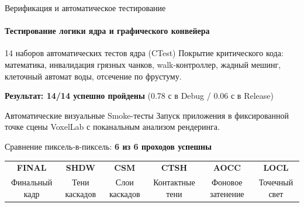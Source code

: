 \begin{frame}{Верификация и автоматическое тестирование}
  \framesubtitle{Тестирование логики ядра и графического конвейера}
  \begin{block}{14 наборов автоматических тестов ядра (CTest)}
    \small
    Покрытие критического кода: математика, инвалидация грязных чанков, walk-контроллер,
    жадный мешинг, клеточный автомат воды, отсечение по фрустуму.
    \begin{center}
      \textbf{Результат: 14/14 успешно пройдены} (0.78 с в Debug / 0.06 с в Release)
    \end{center}
  \end{block}

  \begin{block}{Автоматические визуальные Smoke-тесты}
    \small
    Запуск приложения в фиксированной точке сцены VoxelLab с поканальным анализом рендеринга.
    \begin{center}
      Сравнение пиксель-в-пиксель: \textbf{6 из 6 проходов успешны}
    \end{center}
    \scriptsize
    \begin{tabular}{cccccc}
      \textbf{FINAL} & \textbf{SHDW} & \textbf{CSM} & \textbf{CTSH} & \textbf{AOCC} & \textbf{LOCL} \\
      Финальный кадр & Тени каскадов & Слои каскадов & Контактные тени & Фоновое затенение & Точечный свет \\
    \end{tabular}
  \end{block}
\end{frame}

